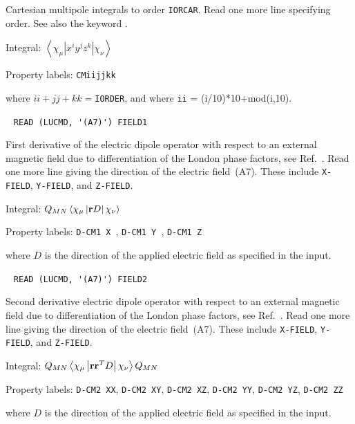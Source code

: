 \begin{description}
Cartesian multipole integrals to order
\verb|IORCAR|. Read one more
line specifying order. See also the keyword .

\begin{list}{}{}
\item Integral:
$\left<\chi_{\mu}\left|x^{i}y^{j}z^{k}\right|\chi_{\nu}\right>$
\item Property labels: \verb|CMiijjkk|
\end{list}
where $ii+jj+kk =$\verb|IORDER|, and where \verb|ii| = (i/10)*10+mod(i,10).

\item[\Key{CM-1}]\verb| |\newline
\verb|READ (LUCMD, '(A7)') FIELD1|

First derivative of the  electric dipole operator
with respect to an external magnetic field
due to differentiation of the London phase
factors, see Ref.~\cite{arthkrabmjpjjcp102}. Read one more line giving
the direction of the electric field~(A7). These 
include \verb|X-FIELD|, \verb|Y-FIELD|, and \verb|Z-FIELD|.

\begin{list}{}{}
\item Integral: $Q_{MN}\left<\chi_{\mu}\left|{\bf
r}D\right|\chi_{\nu}\right>$
\item Property labels: \verb|D-CM1 X |, \verb|D-CM1 Y |, \verb|D-CM1 Z |
\end{list}
where $D$ is the direction of the applied electric field as specified in
the input.

\item[\Key{CM-2}]\verb| |\newline
\verb|READ (LUCMD, '(A7)') FIELD2|

Second derivative electric dipole operator
with respect to an external magnetic field due
to differentiation of
the London phase factors, see Ref.~\cite{arthkrabmjpjjcp102}. Read one
more line giving the direction of the electric
field~(A7). These
include \verb|X-FIELD|, \verb|Y-FIELD|, and \verb|Z-FIELD|.

\begin{list}{}{}
\item Integral: $Q_{MN}\left<\chi_{\mu}\left|{\bf
rr}^{T}D\right|\chi_{\nu}\right>Q_{MN}$
\item Property labels: \verb|D-CM2 XX|, \verb|D-CM2 XY|, \verb|D-CM2 XZ|,
\verb|D-CM2 YY|, \verb|D-CM2 YZ|, \verb|D-CM2 ZZ|
\end{list}
where $D$ is the direction of the applied electric field as specified in
the input.


\end{description}
